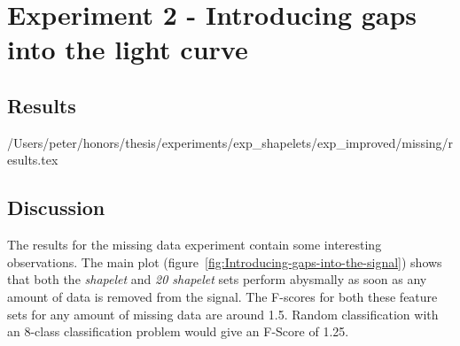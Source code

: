 \clearpage
\section{Experiment 2 - Introducing gaps into the light curve}
\subsection{Results}

{/Users/peter/honors/thesis/experiments/exp_shapelets/exp_improved/missing/results.tex}
\clearpage
\subsection{Discussion}
The results for the missing data experiment contain some interesting observations. The main plot (figure~\ref{fig:Introducing-gaps-into-the-signal}) shows that both the \emph{shapelet} and \emph{20 shapelet} sets perform abysmally as soon as any amount of data is removed from the signal. The F-scores for both these feature sets for any amount of missing data are around 1.5. Random classification with an 8-class classification problem would give an F-Score of 1.25. 

